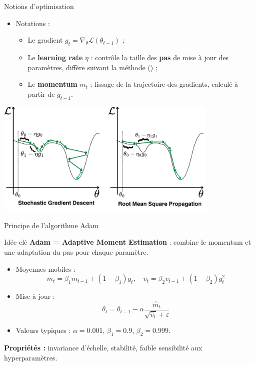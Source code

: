\documentclass{beamer}
\begin{document}
\begin{frame}{Notions d'optimisation}

  \begin{itemize}
    \item Notations :
    \begin{itemize}
      \item Le gradient $g_t = \nabla_{\theta} \mathcal{L}(\theta_{t-1})$ ;
      \item Le \textbf{learning rate} $\eta$ : contrôle la taille des \textbf{pas} de mise à jour des paramètres, diffère suivant la méthode (\cite{ruder2016overview}) ;
      \item Le \textbf{momentum} $m_t$ : lissage de la trajectoire des gradients, calculé à partir de $g_{t-1}$.
    \end{itemize}
  \end{itemize}

  \begin{center}
    \includegraphics[width=0.8\textwidth]{SGD_RMSProp.png}
  \end{center}

\end{frame}


\begin{frame}{Principe de l’algorithme Adam}

\begin{block}{Idée clé}
\textbf{Adam = Adaptive Moment Estimation} :
combine le \textcolor{mygreen}{momentum} et une \textcolor{mygreen}{adaptation du pas} pour chaque paramètre.
\end{block}

\bigskip

\begin{itemize}
  \item Moyennes mobiles :
    \[
      m_t = \beta_1 m_{t-1} + (1 - \beta_1) g_t, \quad
      v_t = \beta_2 v_{t-1} + (1 - \beta_2) g_t^2
    \]
  \item Mise à jour :
    \[
      \theta_t = \theta_{t-1} - \alpha \frac{\hat{m}_t}{\sqrt{\hat{v}_t} + \varepsilon}
    \]
  \item Valeurs typiques : $\alpha{=}0.001$, $\beta_1{=}0.9$, $\beta_2{=}0.999$.
\end{itemize}

\bigskip

\textbf{Propriétés :}
invariance d’échelle, stabilité, faible sensibilité aux hyperparamètres.

\end{frame}
\end{document}
